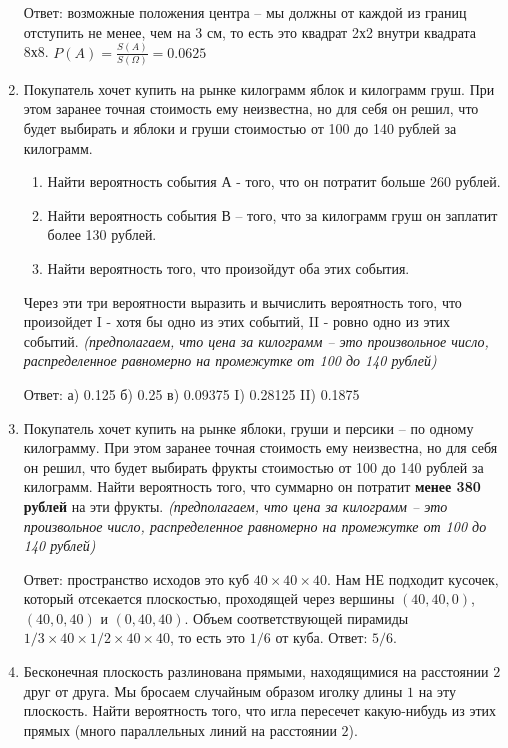 \documentclass{article}
\begin{document}
\begin{enumerate}
    Ответ: возможные положения центра – мы должны от каждой из границ отступить не менее,
    чем на 3 см, то есть это квадрат 2х2 внутри квадрата 8х8. $P(A) = \frac{S(A)}{S(\Omega)} = 0.0625$

    \item Покупатель хочет купить на рынке килограмм яблок и килограмм груш.
    При этом заранее точная стоимость ему неизвестна, но для себя он решил,
    что будет выбирать и яблоки и груши стоимостью от 100 до 140 рублей за килограмм.
    \begin{enumerate}
    \item Найти вероятность события А - того, что он потратит больше 260 рублей.
    \item Найти вероятность события В – того, что за килограмм груш он заплатит более 130 рублей.
    \item Найти вероятность того, что произойдут оба этих события.
    \end{enumerate}

    Через эти три вероятности выразить и вычислить вероятность того,
    что произойдет I - хотя бы одно из этих событий, II - ровно одно из этих событий.
    \textit{(предполагаем, что цена за килограмм  – это произвольное число, распределенное равномерно на промежутке от 100 до 140 рублей)}
    
    Ответ: а) 0.125      б) 0.25   в) 0.09375   I) 0.28125 II) 0.1875

    \item Покупатель хочет купить на рынке яблоки, груши и персики – по одному килограмму.
    При этом заранее точная стоимость ему неизвестна, но для себя он решил, что будет выбирать фрукты стоимостью от 100 до 140 рублей за килограмм.
    Найти вероятность того, что суммарно он потратит \textbf{менее 380 рублей} на эти фрукты.
    \textit{(предполагаем, что цена за килограмм  – это произвольное число, распределенное равномерно на промежутке от 100 до 140 рублей)}
    
    Ответ: пространство исходов это куб $40 \times 40 \times 40$. Нам  НЕ  подходит кусочек, который отсекается плоскостью, проходящей через вершины $(40,40,0)$, $(40,0,40)$ и $(0,40,40)$.
    Объем соответствующей пирамиды $1/3 \times 40 \times 1/2 \times 40 \times 40$, то есть это $1/6$ от куба.
    Ответ: $5/6$.
    
    \item Бесконечная плоскость разлинована  прямыми, находящимися на расстоянии $2$ друг от друга.
    Мы бросаем случайным образом иголку длины $1$ на эту плоскость.
    Найти вероятность того, что игла пересечет какую-нибудь из этих прямых
    (много параллельных линий на расстоянии $2$).
    
\end{enumerate}
\end{document}
